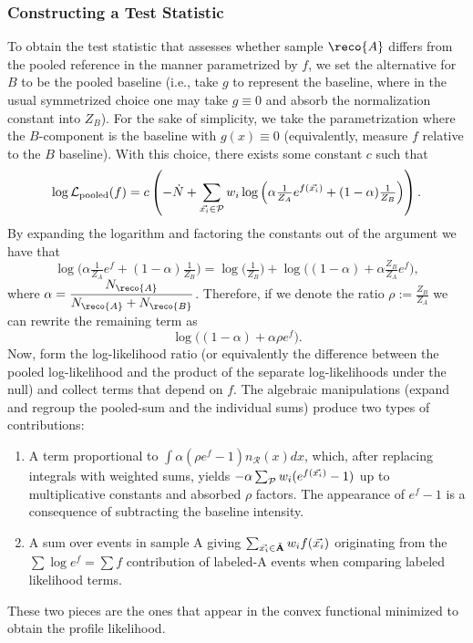 \documentclass[../../ddppaper2.tex]{subfiles}
\begin{document}
\subsubsection{Constructing a Test Statistic}

To obtain the test statistic that assesses whether sample $\reco{A}$ differs from the pooled reference in the manner parametrized by \(f\), we set the alternative for $B$ to be the pooled baseline (i.e., take \(g\) to represent the baseline, where in the usual symmetrized choice one may take \(g\equiv0\) and absorb the normalization constant into \(Z_B\)). For the sake of simplicity, we take the parametrization where the $B$-component is the baseline with \(g(x)\equiv 0\) (equivalently, measure \(f\) relative to the $B$ baseline). With this choice, there exists some constant $c$ such that 
\[
\log\mathcal{L}_{\text{pooled}}(f) =c \left( -\dot{N} + \sum_{{\vec{{x}_i}}\in\mathcal{P}} w_i \log\Big(\alpha \tfrac{1}{Z_A}e^{f({\vec{{x}_i}})} + (1-\alpha)\tfrac{1}{Z_B}\Big)\right).
\]
By expanding the logarithm and factoring the constants out of the argument we have that
\[
\log\Big(\alpha \tfrac{1}{Z_A}e^{f} + (1-\alpha)\tfrac{1}{Z_B}\Big) = \log\Big(\tfrac{1}{Z_B}\Big) + \log\Big((1-\alpha) + \alpha\tfrac{Z_B}{Z_A}e^{f}\Big),
\]
\noindent where \(\alpha=\dfrac{N_\reco{A}}{N_\reco{A}+N_\reco{B}}\). Therefore, if we denote the ratio \(\rho:=\tfrac{Z_B}{Z_A}\) we can rewrite the remaining term as
\[
\log\Big((1-\alpha) + \alpha\rho e^{f}\Big).
\]
Now, form the log-likelihood ratio (or equivalently the difference between the pooled log-likelihood and the product of the separate log-likelihoods under the null) and collect terms that depend on \(f\). The algebraic manipulations (expand and regroup the pooled-sum and the individual sums) produce two types of contributions:
\begin{enumerate}
    \item A term proportional to \(\int \alpha (\rho e^{f}-1) n_{\mathcal{R}}(x)dx\), which, after replacing integrals with weighted sums, yields \(-\alpha\sum_{\mathcal{P}} w_i (e^{f({\vec{{x}_i}})}-1)\) up to multiplicative constants and absorbed \(\rho\) factors. The appearance of \(e^{f}-1\) is a consequence of subtracting the baseline intensity.
    \item A sum over events in sample A giving \(\sum_{{\vec{{x}_i}}\in\tilde{\mathbf{A}}} w_i f({\vec{{x}_i}})\) originating from the \(\sum\log e^{f}=\sum f\) contribution of labeled-A events when comparing labeled likelihood terms.
\end{enumerate}
These two pieces are the ones that appear in the convex functional minimized to obtain the profile likelihood.
\end{document}
